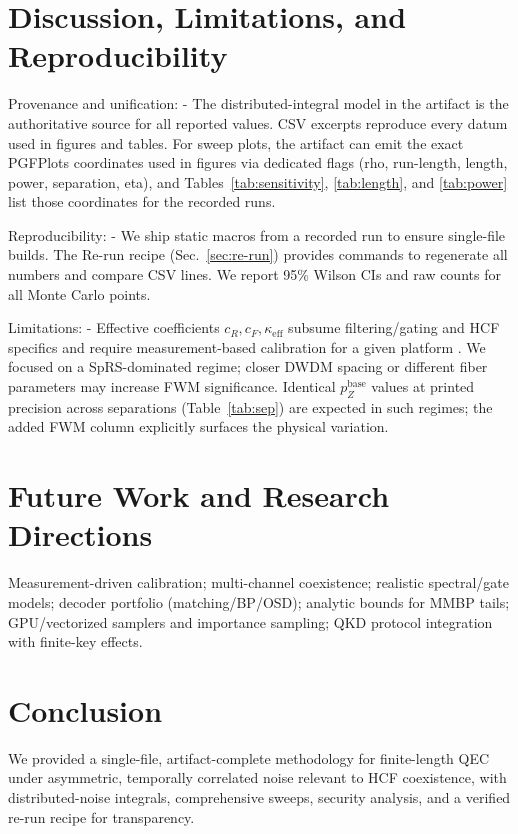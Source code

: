 \documentclass{article}
\begin{document}
\section{Discussion, Limitations, and Reproducibility}\label{sec:discussion}
Provenance and unification:
- The distributed-integral model in the artifact is the authoritative source for all reported values. CSV excerpts reproduce every datum used in figures and tables. For sweep plots, the artifact can emit the exact PGFPlots coordinates used in figures via dedicated flags (rho, run-length, length, power, separation, eta), and Tables~\ref{tab:sensitivity}, \ref{tab:length}, and \ref{tab:power} list those coordinates for the recorded runs.

Reproducibility:
- We ship static macros from a recorded run to ensure single-file builds. The Re-run recipe (Sec.~\ref{sec:re-run}) provides commands to regenerate all numbers and compare CSV lines. We report 95\% Wilson CIs and raw counts for all Monte Carlo points.

Limitations:
- Effective coefficients \(c_R,c_F,\kappa_{\mathrm{eff}}\) subsume filtering/gating and HCF specifics and require measurement-based calibration for a given platform \cite{AgrawalNFO,Patel2012PRX,Kumar2015NJP}. We focused on a SpRS-dominated regime; closer DWDM spacing or different fiber parameters may increase FWM significance. Identical \(p_Z^{\text{base}}\) values at printed precision across separations (Table~\ref{tab:sep}) are expected in such regimes; the added FWM column explicitly surfaces the physical variation.

\section{Future Work and Research Directions}\label{sec:future}
Measurement-driven calibration; multi-channel coexistence; realistic spectral/gate models; decoder portfolio (matching/BP/OSD); analytic bounds for MMBP tails; GPU/vectorized samplers and importance sampling; QKD protocol integration with finite-key effects.

\section{Conclusion}
We provided a single-file, artifact-complete methodology for finite-length QEC under asymmetric, temporally correlated noise relevant to HCF coexistence, with distributed-noise integrals, comprehensive sweeps, security analysis, and a verified re-run recipe for transparency.
\end{document}
